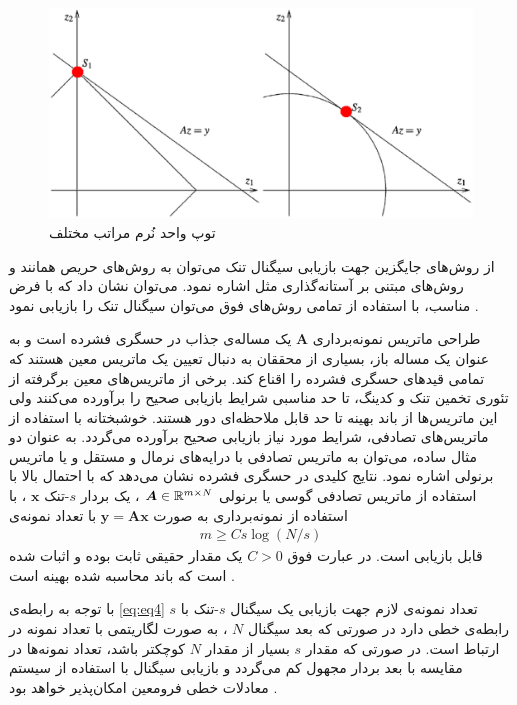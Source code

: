 \begin{figure}
\centering
\includegraphics[scale=0.3]{Images/ch1/fig2.eps}
\caption{توپ واحد نُرم مراتب مختلف}
\label{fig2}
\end{figure}






 از روش‌های جایگزین جهت بازیابی سیگنال تنک می‌توان به روش‌های حریص
همانند 
و روش‌های مبتنی بر آستانه‌گذاری مثل 
اشاره نمود. می‌توان نشان داد که با فرض مناسب، با استفاده از تمامی روش‌های فوق می‌توان سیگنال تنک را بازیابی نمود 
\cite{foucart2013mathematical}.


طراحی ماتریس نمونه‌برداری
$\bm{A}$
یک مساله‌ی جذاب در حسگری فشرده است و به عنوان یک مساله باز، بسیاری از محققان به دنبال تعیین یک ماتریس معین هستند که تمامی قید‌های حسگری فشرده را اقناع کند. برخی از ماتریس‌های معین برگرفته از تئوری تخمین تنک و کدینگ،‌ تا حد مناسبی شرایط بازیابی صحیح را برآورده می‌کنند ولی این ماتریس‌ها از باند بهینه تا حد قابل ملاحظه‌ای دور هستند. خوشبختانه با استفاده از ماتریس‌های تصادفی، شرایط مورد نیاز بازیابی صحیح برآورده می‌گردد. به عنوان دو مثال ساده، می‌توان به ماتریس تصادفی با درایه‌های نرمال و مستقل و یا ماتریس برنولی
اشاره نمود.
نتایج کلیدی در حسگری فشرده نشان می‌دهد که با احتمال بالا با استفاده از ماتریس تصادفی گوسی یا برنولی
$\bm{A}\in \mathbb{R}^{m \times N}$
، یک بردار 
$s$-تنک
$\bm{x}$
، با استفاده از نمونه‌برداری به صورت
$\bm{y}=\bm{A}\bm{x}$
با تعداد نمونه‌ی 
\begin{align}
\label{eq:eq4}
m \geq C s \log(N/s)
\end{align}
قابل بازیابی است. در عبارت فوق 
$C > 0$
یک مقدار حقیقی ثابت بوده و اثبات شده است که باند محاسبه شده بهینه است
\cite{foucart2013mathematical}.


با توجه به رابطه‌ی
\eqref{eq:eq4}
تعداد نمونه‌ی لازم جهت بازیابی یک سیگنال
$s$-تنک
با 
$s$
رابطه‌ی خطی دارد در صورتی که بعد سیگنال
$N$
، به صورت لگاریتمی با تعداد نمونه در ارتباط است. در صورتی که مقدار 
$s$
بسیار از مقدار
$N$
کوچکتر باشد، تعداد نمونه‌ها در مقایسه با بعد بردار مجهول کم می‌گردد و بازیابی سیگنال با استفاده از سیستم معادلات خطی فرومعین امکان‌پذیر خواهد بود
\cite{candes2006robust}. 


